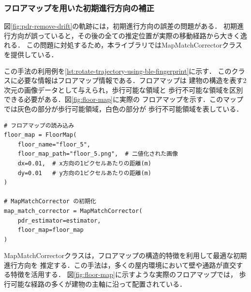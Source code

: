

\subsubsection{フロアマップを用いた初期進行方向の補正}

図\ref{fig:pdr-remove-drift}の軌跡には，初期進行方向の誤差の問題がある．
初期進行方向が誤っていると，その後の全ての推定位置が実際の移動経路から大きく逸れる．
この問題に対処するため，本ライブラリではMapMatchCorrectorクラスを提供している．

この手法の利用例を\ref{lst:rotate-trajectory-using-ble-fingerprint}に示す．
このクラスに必要な情報はフロアマップ情報である．フロアマップは
建物の構造を表す2次元の画像データとして与えられ，歩行可能な領域と
歩行不可能な領域を区別できる必要がある．図\ref{fig:floor-map}に実際の
フロアマップを示す．このマップでは灰色の部分が歩行可能領域，白色の部分が
歩行不可能領域を表している．

\begin{lstlisting}[caption={MapMatchCorrectorの使用例},label=lst:rotate-trajectory-using-ble-fingerprint,float=ht]
# フロアマップの読み込み
floor_map = FloorMap(
    floor_name="floor_5",
    floor_map_path="floor_5.png",  # 二値化された画像
    dx=0.01,  # x方向の1ピクセルあたりの距離(m)
    dy=0.01   # y方向の1ピクセルあたりの距離(m)
)

# MapMatchCorrector の初期化
map_match_corrector = MapMatchCorrector(
    pdr_estimator=estimator,
    floor_map=floor_map
)
\end{lstlisting}

MapMatchCorrectorクラスは，フロアマップの構造的特徴を利用して最適な初期進行方向を
推定する．この手法は，多くの屋内環境において壁や通路が直交する特徴を活用する．
図\ref{fig:floor-map}に示すような実際のフロアマップでは，
歩行可能な経路の多くが建物の主軸に沿って配置されている．

